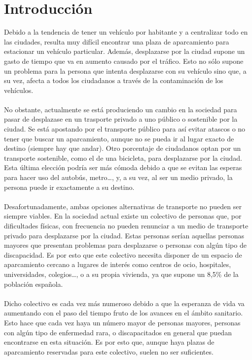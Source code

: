 \chapter{Introducción}
Debido a la tendencia de tener un vehículo por habitante y a centralizar todo en las ciudades, resulta muy difícil encontrar una plaza de aparcamiento para estacionar un vehículo particular. Además, desplazarse por la ciudad supone un gasto de tiempo que va en aumento causado por el tráfico. Esto no sólo supone un problema para la persona que intenta desplazarse con su vehículo sino que, a su vez, afecta a todos los ciudadanos a través de la contaminación de los vehículos.
\\\\
No obstante, actualmente se está produciendo un cambio en la sociedad para pasar de desplazase en un trasporte privado a uno público o sostenible por la ciudad. Se está apostando por el transporte público para así evitar atascos o no tener que buscar un aparcamiento, aunque no se pueda ir al lugar exacto de destino (siempre hay que andar). Otro porcentaje de ciudadanos optan por un transporte sostenible, como el de una bicicleta, para desplazarse por la ciudad. Esta última elección podría ser más cómoda debido a que se evitan las esperas para hacer uso del autobús, metro…, y, a su vez, al ser un medio privado, la persona puede ir exactamente a su destino.
\\\\
Desafortunadamente, ambas opciones alternativas de transporte no pueden ser siempre viables. En la sociedad actual existe un colectivo de personas que, por dificultades físicas, con frecuencia no pueden renunciar a un medio de transporte privado para desplazarse por la ciudad. Estas personas serían aquellas personas mayores que presentan problemas para desplazarse o personas con algún tipo de discapacidad. Es por esto que este colectivo necesita disponer de un espacio de aparcamiento cercano a lugares de interés como centros de ocio, hospitales, universidades, colegios…, o a su propia vivienda, ya que supone un 8,5\% \cite{ine_discapacidad_2008} de la población española. 
\\\\
Dicho colectivo es cada vez más numeroso debido a que la esperanza de vida va aumentando con el paso del tiempo fruto de los avances en el ámbito sanitario. Esto hace que cada vez haya un número mayor de personas mayores, personas con algún tipo de enfermedad rara, o discapacitados en general que puedan encontrarse en esta situación. Es por esto que, aunque haya plazas de aparcamiento reservadas para este colectivo, suelen no ser suficientes.
